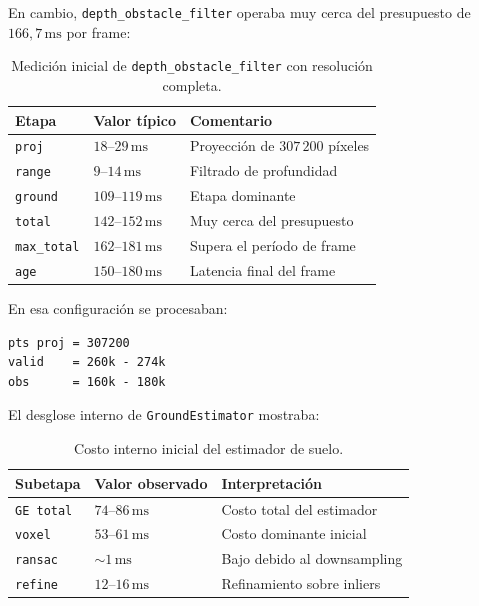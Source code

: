 En cambio, \texttt{depth\_obstacle\_filter} operaba muy cerca del presupuesto
de $166{,}7\,\mathrm{ms}$ por frame:

\begin{table}[H]
\centering
\begin{tabular}{lll}
\toprule
\textbf{Etapa} & \textbf{Valor típico} & \textbf{Comentario} \\
\midrule
\texttt{proj} & $18$--$29\,\mathrm{ms}$ & Proyección de $307\,200$ píxeles \\
\texttt{range} & $9$--$14\,\mathrm{ms}$ & Filtrado de profundidad \\
\texttt{ground} & $109$--$119\,\mathrm{ms}$ & Etapa dominante \\
\texttt{total} & $142$--$152\,\mathrm{ms}$ & Muy cerca del presupuesto \\
\texttt{max\_total} & $162$--$181\,\mathrm{ms}$ & Supera el período de frame \\
\texttt{age} & $150$--$180\,\mathrm{ms}$ & Latencia final del frame \\
\bottomrule
\end{tabular}
\caption{Medición inicial de \texttt{depth\_obstacle\_filter} con resolución completa.}
\label{tab:perf-depth-filter-inicial}
\end{table}

En esa configuración se procesaban:

\begin{verbatim}
pts proj = 307200
valid    = 260k - 274k
obs      = 160k - 180k
\end{verbatim}

El desglose interno de \texttt{GroundEstimator} mostraba:

\begin{table}[H]
\centering
\begin{tabular}{lll}
\toprule
\textbf{Subetapa} & \textbf{Valor observado} & \textbf{Interpretación} \\
\midrule
\texttt{GE total} & $74$--$86\,\mathrm{ms}$ & Costo total del estimador \\
\texttt{voxel} & $53$--$61\,\mathrm{ms}$ & Costo dominante inicial \\
\texttt{ransac} & $\sim 1\,\mathrm{ms}$ & Bajo debido al downsampling \\
\texttt{refine} & $12$--$16\,\mathrm{ms}$ & Refinamiento sobre inliers \\
\bottomrule
\end{tabular}
\caption{Costo interno inicial del estimador de suelo.}
\label{tab:perf-ground-estimator-inicial}
\end{table}

